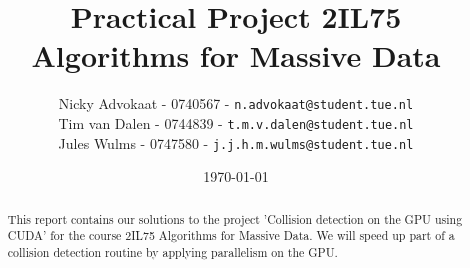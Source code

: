 \documentclass[a4paper,twoside,11pt]{article}
\title{\vspace{-\baselineskip}\sffamily\bfseries Practical Project 2IL75 \\ Algorithms for Massive Data }
\author{
Nicky Advokaat - 0740567 - {\tt n.advokaat@student.tue.nl} \\
Tim van Dalen - 0744839 - {\tt t.m.v.dalen@student.tue.nl}\\
Jules Wulms - 0747580 - {\tt j.j.h.m.wulms@student.tue.nl}\\
}
\date{\today}
\numberwithin{equation}{section}
\begin{document}
\maketitle
\thispagestyle{empty}
\begin{abstract}
This report contains our solutions to the project  'Collision detection on the GPU using CUDA'  for the course 2IL75 Algorithms for Massive Data. We will speed up part of a collision detection routine by applying parallelism on the GPU.
\end{abstract}










\end{document}
